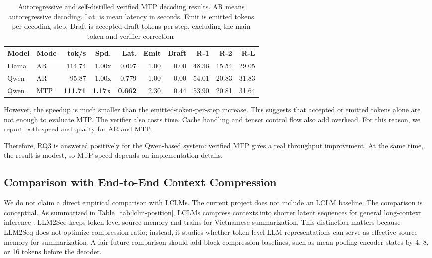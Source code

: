 \documentclass[11pt]{article}
\begin{document}
\begin{table}[t]
\centering
\small
\begin{tabular}{llrrrrrrrr}
\toprule
Model & Mode & tok/s & Spd. & Lat. & Emit & Draft & R-1 & R-2 & R-L \\
\midrule
Llama & AR & 114.74 & 1.00x & 0.697 & 1.00 & 0.00 & 48.36 & 15.54 & 29.05 \\
Qwen & AR & 95.87 & 1.00x & 0.779 & 1.00 & 0.00 & 54.01 & 20.83 & 31.83 \\
Qwen & MTP & \textbf{111.71} & \textbf{1.17x} & \textbf{0.662} & 2.30 & 0.44 & 53.90 & 20.81 & 31.64 \\
\bottomrule
\end{tabular}
\caption{Autoregressive and self-distilled verified MTP decoding results. AR means autoregressive decoding. Lat. is mean latency in seconds. Emit is emitted tokens per decoding step. Draft is accepted draft tokens per step, excluding the main token and verifier correction.}
\label{tab:mtp-results}
\end{table}

However, the speedup is much smaller than the emitted-token-per-step increase.
This suggests that accepted or emitted tokens alone are not enough to evaluate MTP.
The verifier also costs time.
Cache handling and tensor control flow also add overhead.
For this reason, we report both speed and quality for AR and MTP.

Therefore, RQ3 is answered positively for the Qwen-based system: verified MTP gives a real throughput improvement.
At the same time, the result is modest, so MTP speed depends on implementation details.

\subsection{Comparison with End-to-End Context Compression}

We do not claim a direct empirical comparison with LCLMs.
The current project does not include an LCLM baseline.
The comparison is conceptual.
As summarized in Table~\ref{tab:lclm-position}, LCLMs compress contexts into shorter latent sequences for general long-context inference \citep{li2026contextcompression}.
LLM2Seq keeps token-level source memory and trains for Vietnamese summarization.
This distinction matters because LLM2Seq does not optimize compression ratio; instead, it studies whether token-level LLM representations can serve as effective source memory for summarization.
A fair future comparison should add block compression baselines, such as mean-pooling encoder states by 4, 8, or 16 tokens before the decoder.
\end{document}
